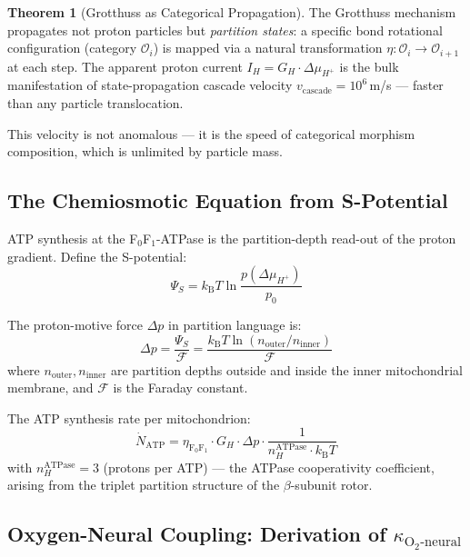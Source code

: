 \documentclass[12pt,a4paper]{article}
\theoremstyle{definition}
\newtheorem{theorem}{Theorem}
\newcommand{\kBT}{k_{\text{B}}T}
\newcommand{\calO}{\mathcal{O}}
\begin{document}
\begin{theorem}[Grotthuss as Categorical Propagation]
The Grotthuss mechanism propagates not proton particles but \emph{partition states}:
a specific bond rotational configuration (category $\calO_i$) is mapped
via a natural transformation $\eta: \calO_i \to \calO_{i+1}$ at each step.
The apparent proton current $I_H = G_H \cdot \Delta\mu_{H^+}$ is the
bulk manifestation of state-propagation cascade velocity
$v_{\text{cascade}} = 10^6$\,m/s — faster than any particle translocation.
\end{theorem}

This velocity is not anomalous — it is the speed of categorical morphism
composition, which is unlimited by particle mass.

\subsection{The Chemiosmotic Equation from S-Potential}

ATP synthesis at the F$_0$F$_1$-ATPase is the partition-depth read-out of
the proton gradient. Define the S-potential:
\begin{equation}
\Psi_S = \kBT \ln \frac{p(\Delta\mu_{H^+})}{p_0}
\end{equation}

The proton-motive force $\Delta p$ in partition language is:
\begin{equation}
\Delta p = \frac{\Psi_S}{\mathcal{F}} = \frac{\kBT \ln(n_{\text{outer}}/n_{\text{inner}})}{\mathcal{F}}
\end{equation}
where $n_{\text{outer}}, n_{\text{inner}}$ are partition depths outside and inside
the inner mitochondrial membrane, and $\mathcal{F}$ is the Faraday constant.

The ATP synthesis rate per mitochondrion:
\begin{equation}
\dot{N}_{\text{ATP}} = \eta_{\text{F}_0\text{F}_1} \cdot G_H \cdot \Delta p \cdot \frac{1}{n_H^{\text{ATPase}} \cdot \kBT}
\end{equation}
with $n_H^{\text{ATPase}} = 3$ (protons per ATP) — the ATPase cooperativity
coefficient, arising from the triplet partition structure of the $\beta$-subunit rotor.

\subsection{Oxygen-Neural Coupling: Derivation of $\kappa_{\text{O}_2\text{-neural}}$}
\end{document}
